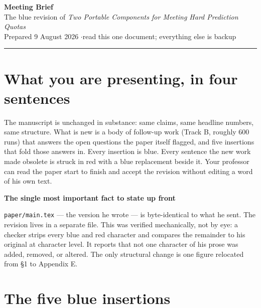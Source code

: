 \documentclass[11pt,a4paper]{article}
\newenvironment{callout}[1]
  {\par\medskip\noindent\begin{lrbox}{\calloutbox}%
   \begin{minipage}{\dimexpr\linewidth-20pt\relax}%
   \textbf{#1}\par\smallskip}
  {\end{minipage}\end{lrbox}%
   \setlength{\fboxsep}{10pt}%
   \colorbox{boxgrey}{\usebox{\calloutbox}}\par\medskip}
\newcommand{\blue}[1]{\textcolor{revblue}{#1}}
\begin{document}
\begin{center}
{\LARGE\bfseries Meeting Brief}\\[3pt]
{\large The blue revision of \emph{Two Portable Components for Meeting Hard
Prediction Quotas}}\\[6pt]
{\small Prepared 9 August 2026 \quad$\cdot$\quad read this one document; everything else is backup}
\end{center}

\vspace{4pt}
\hrule
\vspace{10pt}

\section{What you are presenting, in four sentences}

The manuscript is unchanged in substance: same claims, same headline numbers, same
structure. What is new is a body of follow-up work (Track B, roughly 600 runs) that
answers the open questions the paper itself flagged, and five insertions that fold those
answers in. \blue{Every insertion is blue.} \textcolor{revred}{Every sentence the new work
made obsolete is struck in red with a blue replacement beside it.} Your professor can read
the paper start to finish and accept the revision without editing a word of his own text.

\begin{callout}{The single most important fact to state up front}
\texttt{paper/main.tex} --- the version he wrote --- is byte-identical to what he sent.
The revision lives in a separate file. This was verified mechanically, not by eye: a
checker strips every blue and red character and compares the remainder to his original at
character level. It reports that not one character of his prose was added, removed, or
altered. The only structural change is one figure relocated from \S1 to Appendix E.
\end{callout}

\section{The five blue insertions}
\end{document}
